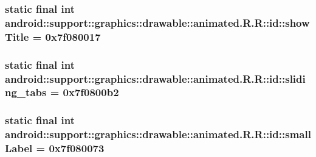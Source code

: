 \hypertarget{classandroid_1_1support_1_1graphics_1_1drawable_1_1animated_1_1_r_1_1id_55eedd3753213be1b0651c87d74f706c}{
\subsubsection[{showTitle}]{\setlength{\rightskip}{0pt plus 5cm}static final int android::support::graphics::drawable::animated.R.R::id::showTitle = 0x7f080017}}
\label{classandroid_1_1support_1_1graphics_1_1drawable_1_1animated_1_1_r_1_1id_55eedd3753213be1b0651c87d74f706c}


\hypertarget{classandroid_1_1support_1_1graphics_1_1drawable_1_1animated_1_1_r_1_1id_2c6fee4ee0bcf82f1c0c4e5c0804238c}{
\subsubsection[{sliding\_\-tabs}]{\setlength{\rightskip}{0pt plus 5cm}static final int android::support::graphics::drawable::animated.R.R::id::sliding\_\-tabs = 0x7f0800b2}}
\label{classandroid_1_1support_1_1graphics_1_1drawable_1_1animated_1_1_r_1_1id_2c6fee4ee0bcf82f1c0c4e5c0804238c}


\hypertarget{classandroid_1_1support_1_1graphics_1_1drawable_1_1animated_1_1_r_1_1id_8f1e16983da68ee2b04ef513f723ea26}{
\subsubsection[{smallLabel}]{\setlength{\rightskip}{0pt plus 5cm}static final int android::support::graphics::drawable::animated.R.R::id::smallLabel = 0x7f080073}}
\label{classandroid_1_1support_1_1graphics_1_1drawable_1_1animated_1_1_r_1_1id_8f1e16983da68ee2b04ef513f723ea26}


